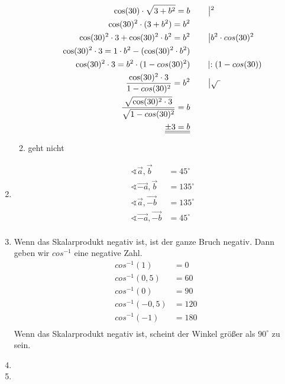 \begin{enumerate}
\begin{enumerate}
			\begin{align*}
			\cos(30) \cdot \sqrt{3+b^2} = b &	\qquad\left|^2\right. \\			
			\cos(30)^2 \cdot (3+b^2) = b^2&\\			
			\cos(30)^2 \cdot 3 + \cos(30)^2 \cdot b^2 = b^2      &\qquad\left|\-b^2\cdot cos(30)^2\right.\\			
			\cos(30)^2 \cdot 3 = 1 \cdot b^2 - (\cos(30)^2 \cdot b^2)\\			
			\cos(30)^2 \cdot 3 = b^2 \cdot (1-cos(30)^2) &\qquad\left|:(1-cos(30))\right.\\		
			\dfrac{\cos(30)^2 \cdot 3}{1-cos(30)^2}=b^2 &\qquad\left|\sqrt{~}\right.\\			
			\dfrac{\sqrt{\cos(30)^2 \cdot 3}}{\sqrt{1-cos(30)^2}}=b\\			
			\underline{\underline{\pm3=b}}
			\end{align*}
			\item	geht nicht%
		\end{enumerate}			
		
		\item
		\begin{align*}
			&&\sphericalangle \vec{a}, \vec{b}   &=45^\circ\\
			&&\sphericalangle \vec{-a}, \vec{b}  &=135^\circ\\
			&&\sphericalangle \vec{a} , \vec{-b} &=135^\circ\\
			&&\sphericalangle \vec{-a}, \vec{-b} &=45^\circ\\
		\end{align*}
		
		\item
		Wenn das Skalarprodukt negativ ist, ist der ganze Bruch negativ. Dann geben wir $cos^{-1}$ eine negative Zahl. 
		\begin{align*}
		cos^{-1}(1)		&= 0\\
		cos^{-1}(0,5)	&= 60\\
		cos^{-1}(0)		&= 90\\
		cos^{-1}(-0,5)	&= 120\\
		cos^{-1}(-1)	&= 180\\
		\end{align*}
		Wenn das Skalarprodukt negativ ist, scheint der Winkel größer als $90^\circ$ zu sein.
		
		\item %
		
		\item %
	\end{enumerate}
	
